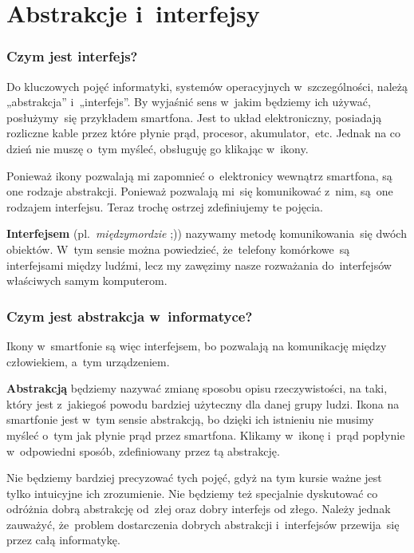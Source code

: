 \documentclass[10pt,t]{beamer}
\begin{document}
\section{Abstrakcje i~interfejsy}


\begin{frame}
  \frametitle{Czym jest interfejs?}


  Do kluczowych pojęć informatyki, systemów operacyjnych w~szczególności,
  należą „abstrakcja” i~„interfejs”. By wyjaśnić sens w~jakim będziemy ich
  używać, posłużymy~się przykładem smartfona. Jest to układ elektroniczny,
  posiadają rozliczne kable przez które płynie prąd, procesor,
  akumulator,~etc. Jednak na co dzień nie muszę o~tym myśleć, obsługuję go
  klikając w~ikony.

  Ponieważ ikony pozwalają mi zapomnieć o~elektronicy wewnątrz smartfona,
  są one rodzaje abstrakcji. Ponieważ pozwalają mi~się komunikować z~nim,
  są~one rodzajem interfejsu. Teraz trochę ostrzej zdefiniujemy te pojęcia.

  \textbf{Interfejsem} (pl.~\textit{międzymordzie} ;)) nazywamy metodę
  komunikowania~się dwóch obiektów. W~tym sensie można powiedzieć,
  że~telefony komórkowe~są interfejsami między ludźmi, lecz my zawęzimy
  nasze rozważania do~interfejsów właściwych samym komputerom.

\end{frame}





\begin{frame}
  \frametitle{Czym jest abstrakcja w~informatyce?}


  Ikony w~smartfonie są więc interfejsem, bo pozwalają na komunikację
  między człowiekiem, a~tym urządzeniem.

  \textbf{Abstrakcją} będziemy nazywać zmianę sposobu opisu rzeczywistości,
  na taki, który jest z~jakiegoś powodu bardziej użyteczny dla danej grupy
  ludzi. Ikona na smartfonie jest w~tym sensie abstrakcją, bo dzięki ich
  istnieniu nie musimy myśleć o~tym jak płynie prąd przez smartfona.
  Klikamy w~ikonę i~prąd popłynie w~odpowiedni sposób, zdefiniowany przez
  tą abstrakcję.

  Nie będziemy bardziej precyzować tych pojęć, gdyż na tym kursie ważne
  jest tylko intuicyjne ich zrozumienie. Nie będziemy też
  specjalnie dyskutować co odróżnia dobrą abstrakcję od~złej oraz dobry
  interfejs od złego. Należy jednak zauważyć, że~problem dostarczenia
  dobrych abstrakcji i~interfejsów przewija~się przez całą informatykę.

\end{frame}
\end{document}
